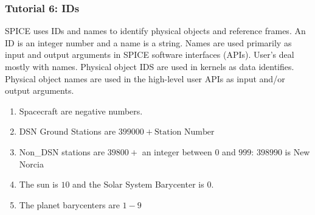 \documentclass[crop=false,class=book]{standalone}
\begin{document}
            \subsubsection{Tutorial 6: IDs}
            SPICE uses IDs and names to identify physical objects and reference frames. An ID is an integer number and a name is a string. Names are used primarily as input and output arguments in SPICE software interfaces (APIs). User's deal mostly with names. Physical object IDS are used in kernels as data identifies. Physical object names are used in the high-level user APIs as input and/or output arguments. 
            \begin{enumerate}
                \item Spacecraft are negative numbers.
                \begin{itemize}
                \end{itemize}
                \item DSN Ground Stations are $399000+\textrm{Station Number}$
                \begin{itemize}
                \end{itemize}
                \item Non\_DSN stations are $39800+$ an integer between $0$ and $999$: $398990$ is New Norcia
                \item The sun is $10$ and the Solar System Barycenter is $0$.
                \item The planet barycenters are $1-9$
                \begin{itemize}
\end{itemize}
\end{enumerate}
\end{document}
